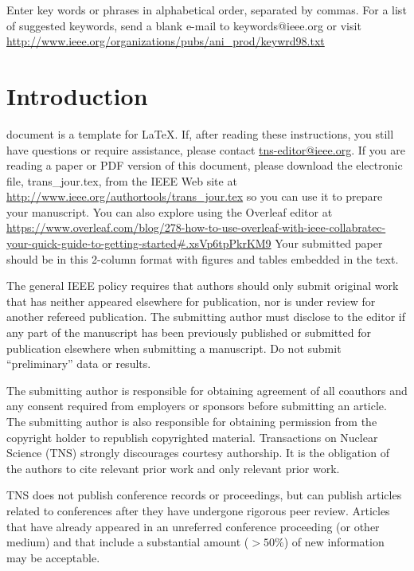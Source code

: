 \documentclass{IEEEtran}
\begin{document}
\begin{IEEEkeywords}
Enter key words or phrases in alphabetical
order, separated by commas. For a list of suggested keywords, send a blank
e-mail to keywords@ieee.org or visit \underline
{http://www.ieee.org/organizations/pubs/ani\_prod/keywrd98.txt}
\end{IEEEkeywords}

\section{Introduction}
\label{sec:introduction}
 document is a template for \LaTeX. If, after reading these
instructions, you still have questions or require assistance, please contact
\underline {tns-editor@ieee.org}. If you are
reading a paper or PDF version of this document, please download the
electronic file, trans\_jour.tex, from the IEEE Web site at \underline
{http://www.ieee.org/authortools/trans\_jour.tex} so you can use it
to prepare your manuscript. You can also explore using the Overleaf editor at
\underline{https://www.overleaf.com/blog/278-how-to-use-overleaf-with-}\discretionary{}{}{}\underline
{ieee-collabratec-your-quick-guide-to-getting-started\#.}\discretionary{}{}{}\underline{xsVp6tpPkrKM9}
Your submitted paper should be
in this 2-column format with figures and tables embedded in the text.

The general IEEE policy requires that authors should only submit original
work that has neither appeared elsewhere for publication, nor is under
review for another refereed publication. The submitting author must disclose
to the editor if any part of the manuscript has been previously published or
submitted for publication elsewhere when submitting a manuscript. Do not
submit ``preliminary'' data or results.

The submitting author is responsible for obtaining agreement of all
coauthors and any consent required from employers or sponsors before
submitting an article. The submitting author is also responsible for
obtaining permission from the copyright holder to republish copyrighted
material. Transactions on Nuclear Science (TNS) strongly discourages
courtesy authorship. It is the obligation of the authors to cite relevant
prior work and only relevant prior work.

TNS does not publish conference records or proceedings, but can publish
articles related to conferences after they have undergone rigorous peer
review. Articles that have already appeared in an unreferred conference
proceeding (or other medium) and that include a substantial amount
($>50\%$) of new information may be acceptable.
\end{document}
